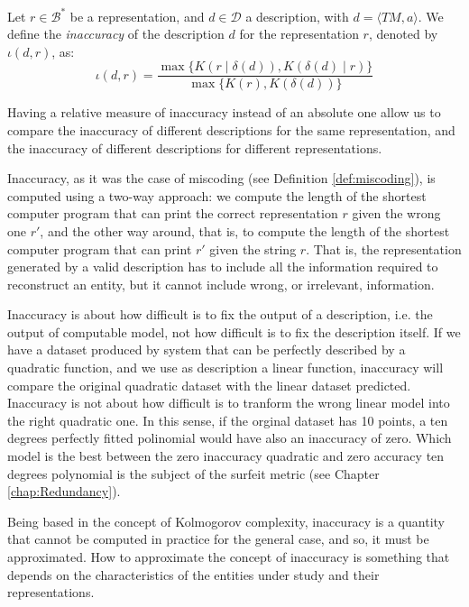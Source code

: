 \begin{definition} [Inaccuracy]
\label{def:inaccuracy:inaccuracy:inaccuracy}
Let $r \in \mathcal{B}^\ast$ be a representation, and $d \in \mathcal{D}$ a description, with $d = \langle TM, a \rangle$. We define the \emph{inaccuracy} of the description $d$ for the representation $r$, denoted by $\iota(d, r)$, as:
\[
\iota(d, r) = \frac{ \max\{ K \left(r \mid \delta(d) \right), K \left( \delta(d) \mid r \right) \} } { \max\{ K(r), K \left(\delta(d) \right) \} }
\]
\end{definition}

Having a relative measure of inaccuracy instead of an absolute one allow us to compare the inaccuracy of different descriptions for the same representation, and the inaccuracy of different descriptions for different representations.

Inaccuracy, as it was the case of miscoding (see Definition \ref{def:miscoding}), is computed using a two-way approach: we compute the length of the shortest computer program that can print the correct representation $r$ given the wrong one $r'$, and the other way around, that is, to compute the length of the shortest computer program that can print $r'$ given the string $r$. That is, the representation generated by a valid description has to include all the information required to reconstruct an entity, but it cannot include wrong, or irrelevant, information. 

\begin{example}
Inaccuracy is about how difficult is to fix the output of a description, i.e. the output of computable model, not how difficult is to fix the description itself. If we have a dataset produced by system that can be perfectly described by a quadratic function, and we use as description a linear function, inaccuracy will compare the original quadratic dataset with the linear dataset predicted. Inaccuracy is not about how difficult is to tranform the wrong linear model into the right quadratic one. In this sense, if the orginal dataset has 10 points, a ten degrees perfectly fitted polinomial would have also an inaccuracy of zero. Which model is the best between the zero inaccuracy quadratic and zero accuracy ten degrees polynomial is the subject of the surfeit metric (see Chapter \ref{chap:Redundancy}).
\end{example}

Being based in the concept of Kolmogorov complexity, inaccuracy is a quantity that cannot be computed in practice for the general case, and so, it must be approximated. How to approximate the concept of inaccuracy is something that depends on the characteristics of the entities under study and their representations.

